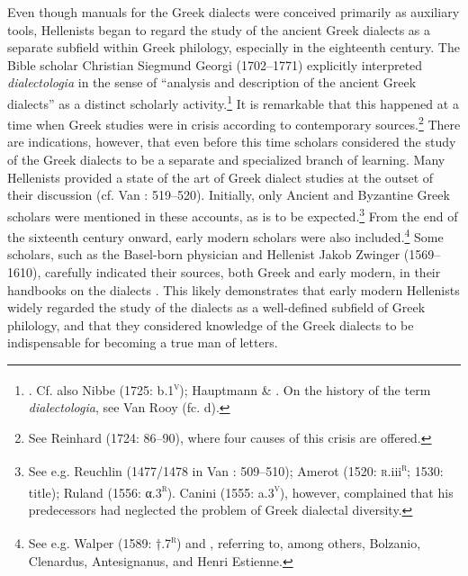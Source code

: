 Even though manuals for the Greek dialects were conceived primarily as auxiliary tools, Hellenists began to regard the study of the ancient Greek dialects as a separate subfield within Greek philology, especially in the eighteenth century. The Bible scholar Christian Siegmund Georgi (1702–1771) explicitly interpreted \textit{dialectologia} in the sense of “analysis and description of the ancient Greek dialects” as a distinct scholarly activity.\footnote{\citet[16]{Georgi1733}. Cf. also Nibbe (1725: b.1\textsc{\textsuperscript{v}}); Hauptmann \& \citet[15]{Schmid1737}. On the history of the term \textit{dialectologia}, see Van Rooy (fc. d).} It is remarkable that this happened at a time when Greek studies were in crisis according to contemporary sources.\footnote{See Reinhard (1724: 86–90), where four causes of this crisis are offered.} There are indications, however, that even before this time scholars considered the study of the Greek dialects to be a separate and specialized branch of learning. Many Hellenists provided a state of the art of Greek dialect studies at the outset of their discussion (cf. Van \citealt{Rooy2014}: 519–520). Initially, only Ancient and Byzantine Greek scholars were mentioned in these accounts, as is to be expected.\footnote{See e.g. Reuchlin (1477/1478 in Van \citealt{Rooy2014}: 509–510); Amerot (1520: \textsc{r.}iii\textsc{\textsuperscript{r}}\textsc{;} \textsc{1530:} title); Ruland (1556: α.3\textsc{\textsuperscript{r}}). Canini (1555: a.3\textsc{\textsuperscript{v}}), however, complained that his predecessors had neglected the problem of Greek dialectal diversity.} From the end of the sixteenth century onward, early modern scholars were also included.\footnote{See e.g. Walper (1589: †.7\textsc{\textsuperscript{r}}) and \citet[1]{Schmidt1604}, referring to, among others, Bolzanio, Clenardus, Antesignanus, and Henri Estienne.} Some scholars, such as the Basel-born physician and Hellenist Jakob Zwinger (1569–1610), carefully indicated their sources, both Greek and early modern, in their handbooks on the dialects \citep{Zwinger1605}{.} This likely demonstrates that early modern Hellenists widely regarded the study of the dialects as a well-defined subfield of Greek philology, and that they considered knowledge of the Greek dialects to be indispensable for becoming a true man of letters.

